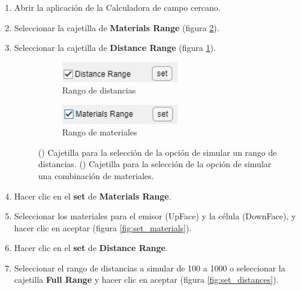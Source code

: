 \begin{enumerate}
	\item Abrir la aplicación de la Calculadora de campo cercano.
	\item Seleccionar la cajetilla de \textbf{Materials Range} (figura \ref{fig:check_materials}). 
	\item Seleccionar la cajetilla de \textbf{Distance Range} (figura \ref{fig:check_distances}).
	\begin{figure}[H]%
	\begin{subfigure}[b]{0.48\textwidth}
		\centering
			\includegraphics[width=0.6\textwidth]{figuras/Procedimiento_Simulaciones/Radiacion/check_distances2.png}
		\caption{Rango de distancias}
		\label{fig:check_distances}
	\end{subfigure}
	\hfill
	\begin{subfigure}[b]{0.48\textwidth}
		\centering
			\includegraphics[width=0.6\textwidth]{figuras/Procedimiento_Simulaciones/Radiacion/check_materials2.png}
		\caption{Rango de materiales}
		\label{fig:check_materials}
	\end{subfigure}
	\caption{() Cajetilla para la selección de la opción de simular un rango de distancias. () Cajetilla para la selección de la opción de simular una combinación de materiales.}%
	\label{fig:checkboxes}%
	\end{figure}
	\item Hacer clic en el \textbf{set} de \textbf{Materials Range}.
	\item Seleccionar los materiales para el emisor (UpFace) y la célula (DownFace), y hacer clic en aceptar (figura \ref{fig:set_materials}).
	\item Hacer clic en el \textbf{set} de \textbf{Distance Range}.	
	\item Seleccionar el rango de distancias a simular de 100 a 1000 o seleccionar la cajetilla \textbf{Full Range} y hacer clic en aceptar (figura \ref{fig:set_distances}).%
	\begin{figure}[H]%
	\begin{subfigure}[b]{0.48\textwidth}

\end{subfigure}
\end{figure}
\end{enumerate}
